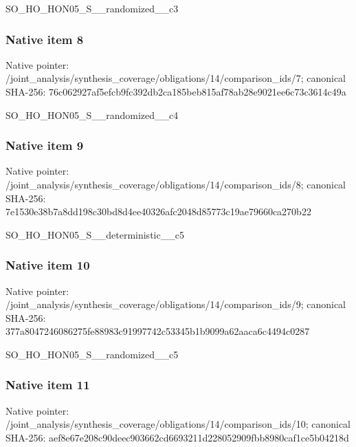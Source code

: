 \documentclass[10pt,a4paper]{article}
\begin{document}
\begingroup\raggedright\sloppy SO\_\allowbreak{}HO\_\allowbreak{}HON05\_\allowbreak{}S\_\allowbreak{}\_\allowbreak{}randomized\_\allowbreak{}\_\allowbreak{}c3\par\endgroup

\subsubsection{Native item 8}
Native pointer: /joint\_\allowbreak{}analysis/synthesis\_\allowbreak{}coverage/obligations/14/comparison\_\allowbreak{}ids/7; canonical SHA-256: 76c062927af5efcb9fc392db2ca185beb815af78ab28e9021ee6c73c3614c49a

\begingroup\raggedright\sloppy SO\_\allowbreak{}HO\_\allowbreak{}HON05\_\allowbreak{}S\_\allowbreak{}\_\allowbreak{}randomized\_\allowbreak{}\_\allowbreak{}c4\par\endgroup

\subsubsection{Native item 9}
Native pointer: /joint\_\allowbreak{}analysis/synthesis\_\allowbreak{}coverage/obligations/14/comparison\_\allowbreak{}ids/8; canonical SHA-256: 7e1530e38b7a8dd198c30bd8d4ee40326afc2048d85773c19ae79660ca270b22

\begingroup\raggedright\sloppy SO\_\allowbreak{}HO\_\allowbreak{}HON05\_\allowbreak{}S\_\allowbreak{}\_\allowbreak{}deterministic\_\allowbreak{}\_\allowbreak{}c5\par\endgroup

\subsubsection{Native item 10}
Native pointer: /joint\_\allowbreak{}analysis/synthesis\_\allowbreak{}coverage/obligations/14/comparison\_\allowbreak{}ids/9; canonical SHA-256: 377a8047246086275fe88983c91997742c53345b1b9099a62aaca6c4494c0287

\begingroup\raggedright\sloppy SO\_\allowbreak{}HO\_\allowbreak{}HON05\_\allowbreak{}S\_\allowbreak{}\_\allowbreak{}randomized\_\allowbreak{}\_\allowbreak{}c5\par\endgroup

\subsubsection{Native item 11}
Native pointer: /joint\_\allowbreak{}analysis/synthesis\_\allowbreak{}coverage/obligations/14/comparison\_\allowbreak{}ids/10; canonical SHA-256: aef8e67e208c90deec903662cd6693211d228052909fbb8980caf1ce5b04218d
\end{document}
